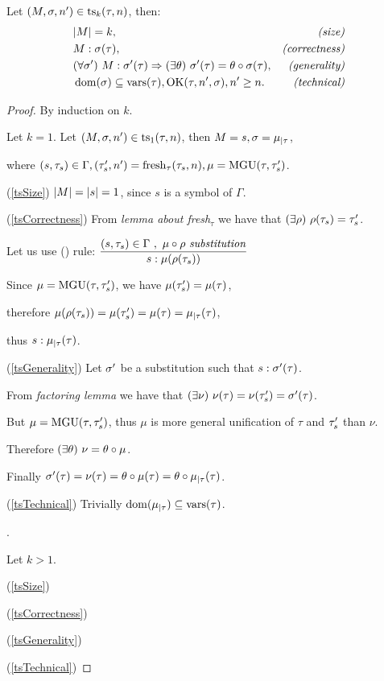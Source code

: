 \documentclass[a4paper,oneside]{memoir}
\begin{document}
\begin{lemma}
Let $(M, \sigma, n^\prime) \in \operatorname{ts}_{k}(\tau,n)$, then: 
\begin{align}
& \lvert M \rvert = k,  
&\textit{(size)} \label{tsSize} \\
& M : \sigma(\tau), 
&\textit{(correctness)} \label{tsCorrectness} \\
& (\forall \sigma^\prime)\ M : \sigma^\prime(\tau) \Rightarrow  (\exists \theta)\ \sigma^\prime(\tau) = \theta\circ\sigma(\tau),
& \textit{(generality)} \label{tsGenerality} \\
& \operatorname{dom}(\sigma) \subseteq \operatorname{vars}(\tau),\operatorname{OK}(\tau,n^\prime,\sigma), n^\prime \geq n.
& \textit{(technical)} \label{tsTechnical}
\end{align}
\end{lemma}
\begin{proof}

By induction on $k$. 

Let $k = 1$. 
Let $(M, \sigma, n^\prime) \in \operatorname{ts}_{1}(\tau,n)$, 
then $M = s, \sigma = {\mu}_{\mid \tau}$,

where 
$(s,\tau_s) \in \Gamma,
(\tau_s^\prime,n^\prime) = \operatorname{fresh}_{\tau}(\tau_s, n),
\mu = \operatorname{MGU}(\tau,\tau_s^\prime)$.
 
(\ref{tsSize}) $\lvert M \rvert = \lvert s \rvert = 1$, since $s$ is a symbol of $\Gamma$.

(\ref{tsCorrectness}) From \textit{lemma about fresh$_\tau$} we have that 
$(\exists \rho)\ \rho(\tau_s) = \tau_s^\prime$. 

Let us use (\AX) rule:
$\dfrac{(s,\tau_s) \in \Gamma\ ,\ \mu \circ \rho\ \mathit{substitution}}{s : \mu(\rho(\tau_s))}$

Since $\mu = \operatorname{MGU}(\tau,\tau_s^\prime)$, we have $\mu(\tau_s^\prime) = \mu(\tau)$, 

therefore $\mu(\rho(\tau_s)) = \mu(\tau_s^\prime) = \mu(\tau) = {\mu}_{\mid \tau}(\tau)$, 

thus $s : {\mu}_{\mid \tau}(\tau)$.

(\ref{tsGenerality}) Let $\sigma^\prime$ be a substitution such that $s : \sigma^\prime(\tau)$.

From \textit{factoring lemma} we have that
$(\exists \nu)\ \nu(\tau) = \nu(\tau_s^\prime) = \sigma^\prime(\tau)$. 

But $\mu = \operatorname{MGU}(\tau,\tau_s^\prime)$, thus 
$\mu$ is more general unification of $\tau$ and $\tau_s^\prime$ than $\nu$.

Therefore $(\exists \theta)\ \nu = \theta \circ \mu$.

Finally $\sigma^\prime(\tau) = \nu(\tau) = \theta \circ \mu(\tau) = \theta \circ {\mu}_{\mid \tau} (\tau)$.

(\ref{tsTechnical}) Trivially $\operatorname{dom}({\mu}_{\mid \tau}) \subseteq \operatorname{vars}(\tau)$.

.

Let $k > 1$. 

(\ref{tsSize})

(\ref{tsCorrectness})

(\ref{tsGenerality})

(\ref{tsTechnical})


\end{proof}
\end{document}
